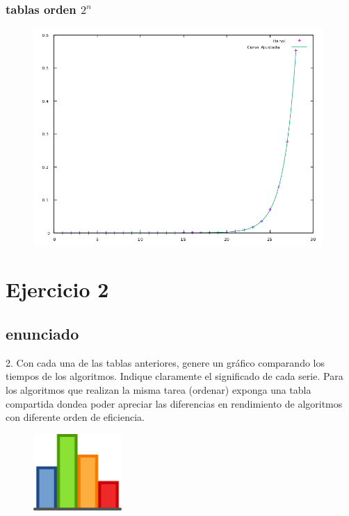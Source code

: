 \documentclass[compress]{beamer}
\begin{document}
\begin{frame}
\frametitle{tablas orden $2^n$}
	\begin{figure}
  \centering
    \includegraphics[width=0.98\textwidth]{HanoiAjustada.png}
  \label{fig:ejemplo}
\end{figure}
\end{frame}

\section{Ejercicio 2}
\subsection{enunciado}

\begin{frame}
	2. Con cada una de las tablas anteriores, genere un gráfico comparando los tiempos  de
los algoritmos. Indique claramente el significado de cada serie. Para los algoritmos que
realizan la misma tarea (ordenar) exponga una tabla compartida dondea poder apreciar las diferencias en rendimiento de algoritmos con diferente orden de
eficiencia.
	\begin{figure}
  \centering
    \includegraphics[width=0.3\textwidth]{graf.png}
  \label{fig:ejemplo}
\end{figure}
\end{frame}
\end{document}
